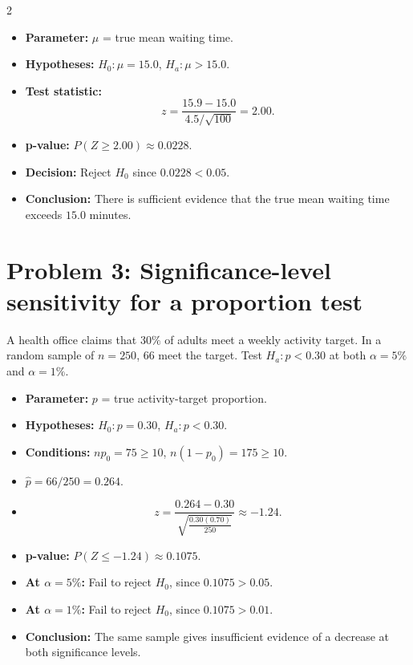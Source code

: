 \begin{multicols}{2}
\begin{itemize}
    \item \textbf{Parameter:} \(\mu\) = true mean waiting time.
    \item \textbf{Hypotheses:} \(H_0:\mu=15.0\), \(H_a:\mu>15.0\).
    \item \textbf{Test statistic:}
    \[
    z=\frac{15.9-15.0}{4.5/\sqrt{100}}=2.00.
    \]
    \item \textbf{p-value:} \(P(Z\ge2.00)\approx0.0228\).
    \item \textbf{Decision:} Reject \(H_0\) since \(0.0228<0.05\).
    \item \textbf{Conclusion:} There is sufficient evidence that the true mean waiting time exceeds \(15.0\) minutes.
\end{itemize}

\begin{center}
\end{center}

\section{Problem 3: Significance-level sensitivity for a proportion test}
A health office claims that \(30\%\) of adults meet a weekly activity target. In a random sample of \(n=250\), \(66\) meet the target. Test \(H_a:p<0.30\) at both \(\alpha=5\%\) and \(\alpha=1\%\).

\begin{itemize}
    \item \textbf{Parameter:} \(p\) = true activity-target proportion.
    \item \textbf{Hypotheses:} \(H_0:p=0.30\), \(H_a:p<0.30\).
    \item \textbf{Conditions:} \(np_0=75\ge10\), \(n(1-p_0)=175\ge10\).
    \item \(\hat p=66/250=0.264\).
    \item \[z=\frac{0.264-0.30}{\sqrt{\frac{0.30(0.70)}{250}}}\approx -1.24.\]
    \item \textbf{p-value:} \(P(Z\le-1.24)\approx0.1075\).
    \item \textbf{At \(\alpha=5\%\):} Fail to reject \(H_0\), since \(0.1075>0.05\).
    \item \textbf{At \(\alpha=1\%\):} Fail to reject \(H_0\), since \(0.1075>0.01\).
    \item \textbf{Conclusion:} The same sample gives insufficient evidence of a decrease at both significance levels.
\end{itemize}


\end{multicols}
